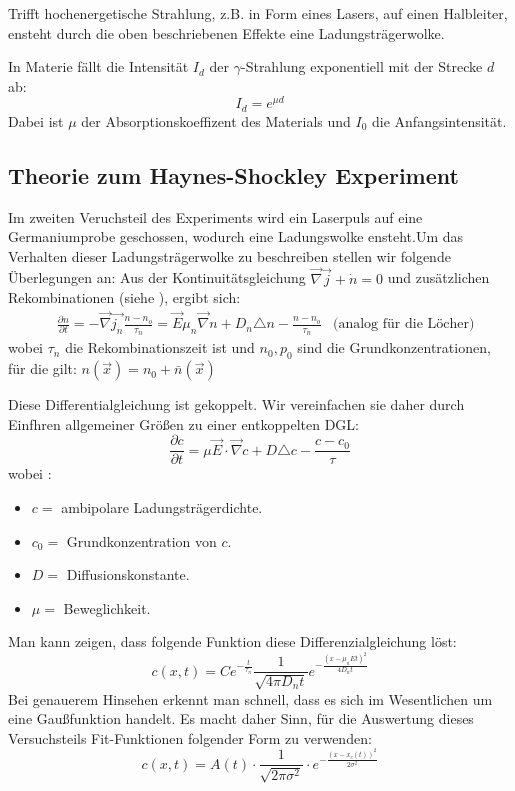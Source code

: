 \documentclass[12pt]{article}
\newcommand{\nab}{\vec{\nabla}} %
\begin{document}
Trifft hochenergetische Strahlung, z.B. in Form eines Lasers, auf einen Halbleiter, ensteht durch die oben beschriebenen Effekte eine Ladungsträgerwolke.

In Materie fällt die Intensität $I_d$ der $\gamma$-Strahlung exponentiell mit der Strecke $d$ ab:
\[I_d=e^{\mu d}\]
Dabei ist $\mu$ der Absorptionskoeffizent des Materials und $I_0$ die Anfangsintensität.

\subsection{Theorie zum Haynes-Shockley Experiment}

Im zweiten Veruchsteil des Experiments wird ein Laserpuls auf eine Germaniumprobe geschossen, wodurch eine Ladungswolke ensteht.Um das Verhalten dieser Ladungsträgerwolke zu beschreiben stellen wir folgende Überlegungen an: Aus der Kontinuitätsgleichung $\vec{\nabla}\vec{j}+\dot{n}=0$ und zusätzlichen Rekombinationen (siehe \cite{staat}), ergibt sich:
\begin{align*}
&\frac{\partial n}{\partial t}=-\vec{\nabla}\vec{j_n}\frac{n-n_o}{\tau_n}=\vec{E}\mu_n\vec{\nabla}n+D_n\triangle n-\frac{n-n_o}{\tau_n}&\mbox{(analog für die Löcher)}
\end{align*}
wobei  $\tau_n$ die  Rekombinationszeit ist und $n_0,p_0$ sind die Grundkonzentrationen, für die gilt: $n(\vec{x})=n_0+\bar{n}(\vec{x})$

Diese Differentialgleichung ist gekoppelt. Wir vereinfachen sie daher durch Einfhren allgemeiner Größen zu einer entkoppelten DGL:
\[\frac{\partial c}{\partial t}=\mu\vec{E}\cdot\nab c+D\triangle c-\frac{c-c_0}{\tau}\]
wobei :
\begin{itemize}
	\item $c=$  ambipolare Ladungsträgerdichte.
	\item $c_0=$  Grundkonzentration von $c$.
	\item $D=$  Diffusionskonstante.
	\item $\mu=$ Beweglichkeit.
\end{itemize}
Man kann zeigen, dass folgende Funktion diese Differenzialgleichung löst:
\[c(x,t)=Ce^{-\frac{t}{\tau_n}}\frac{1}{\sqrt{4\pi D_n t}}e^{-\frac{(x-\mu_n E t)^2}{4D_n t}}\]
Bei genauerem Hinsehen erkennt man schnell, dass es sich im Wesentlichen um eine Gaußfunktion handelt. Es macht daher Sinn, für die Auswertung dieses Versuchsteils Fit-Funktionen folgender Form zu verwenden:
\[c(x,t)=A(t)\cdot\frac{1}{\sqrt{2\pi\sigma^2}}\cdot e^{-\frac{(x-x_c(t))^2}{2\sigma^2}}\]
\end{document}
